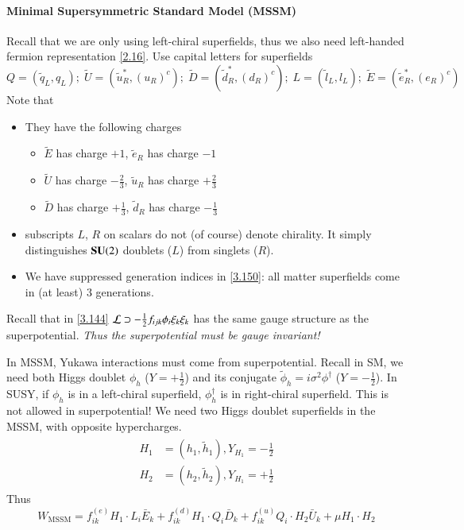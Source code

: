 \paragraph{Minimal Supersymmetric Standard Model (MSSM)}
Recall that we are only using left-chiral superfields, thus we also need left-handed fermion representation \eqref{2.16}. Use capital letters for superfields
\begin{equation}
   Q = (\tilde q_L, q_L); \; \tilde U = (\tilde u^*_R, (u_R)^c); \; \tilde D = (\tilde d_R^*, (d_R)^c); \; L = (\tilde{l}_L, l_L); \; \tilde E = (\tilde e_R^*, (e_R)^c) \label{3.150}
\end{equation}
Note that 
\begin{itemize}
   \item They have the following charges
   \begin{itemize}
   \item $\tilde E$ has charge $+1$, $\tilde e_R$ has charge $-1$ 
   \item $\tilde U$ has charge $-\frac{2}{3}$, $\tilde u_R$ has charge $+\frac{2}{3}$
   \item $\tilde D$ has charge $+\frac{1}{3}$, $\tilde d_R$ has charge $-\frac{1}{3}$
   \end{itemize}
\item subscripts $L$, $R$ on scalars do not (of course) denote chirality.  It simply distinguishes $\mathbf{SU}(2)$ doublets ($L$) from singlets ($R$).
\item We have suppressed generation indices in \eqref{3.150}: all matter superfields come in (at least) $3$ generations.
\end{itemize}

Recall that in \eqref{3.144} $\mathcal{L} \supset -\frac{1}{2} f_{ijk} \phi_i \xi_k \xi_k$ has the same gauge structure as the superpotential. \textit{Thus the superpotential must be gauge invariant!}

In MSSM, Yukawa interactions must come from superpotential. Recall in SM, we need both Higgs doublet $\phi_h$ ($Y=+\frac{1}{2}$) and its conjugate $\tilde \phi_h = i \sigma^2 \phi^\dagger$ ($Y=-\frac{1}{2}$). In SUSY, if $\phi_h$ is in a left-chiral superfield, $\phi_h^\dagger$ is in right-chiral superfield. This is not allowed in superpotential! We need two Higgs doublet superfields in the MSSM, with opposite hypercharges.
\begin{align}
   \begin{split}
      H_1 &= (h_1, \tilde{h}_1), Y_{H_1} = -\frac{1}{2}   \\
      H_2 &= (h_2, \tilde{h}_2), Y_{H_1} = +\frac{1}{2}   
   \end{split}
   \label{3.151}
\end{align}
Thus
\begin{equation}
   W_\text{MSSM} = f_{ik}^{(e)} H_1 \cdot L_i \bar E_k + f_{ik}^{(d)} H_1 \cdot Q_i \bar D_k + f_{ik}^{(u)} Q_i \cdot H_2 \bar U_k + \mu H_1 \cdot H_2 \label{3.152}
\end{equation}

